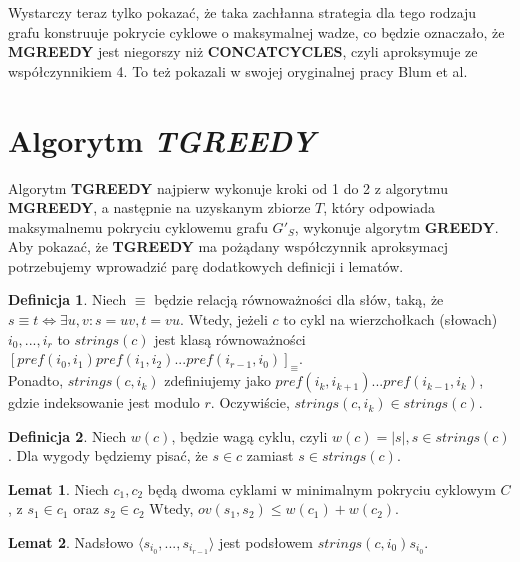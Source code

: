 \documentclass[12pt]{article}
\theoremstyle{definition}
\newtheorem{lemma}{Lemat}
\newtheorem{definition}{Definicja}
\begin{document}
Wystarczy teraz tylko pokazać, że taka zachłanna strategia dla tego rodzaju grafu konstruuje pokrycie cyklowe o maksymalnej wadze, co będzie oznaczało, że \textbf{MGREEDY} jest niegorszy niż \textbf{CONCATCYCLES}, czyli aproksymuje ze współczynnikiem 4. To też pokazali w swojej oryginalnej pracy Blum et al.

\section*{Algorytm \textit{TGREEDY}}

Algorytm \textbf{TGREEDY} najpierw wykonuje kroki od 1 do 2 z algorytmu \textbf{MGREEDY}, a następnie na uzyskanym zbiorze $T$, który odpowiada
maksymalnemu pokryciu cyklowemu grafu $G'_S$, wykonuje algorytm \textbf{GREEDY}. Aby pokazać, że \textbf{TGREEDY} ma pożądany współczynnik aproksymacj potrzebujemy wprowadzić parę dodatkowych definicji i lematów.

\begin{definition} Niech $\equiv$ będzie relacją równoważności dla słów, taką, że $s \equiv t \Leftrightarrow \exists u,v: s = uv, t = vu$. 
Wtedy, jeżeli $c$ to cykl na wierzchołkach (słowach) $i_0, ..., i_r$ to 
$strings(c)$ jest klasą równoważności $[pref(i_0, i_1)pref(i_1,i_2)...pref(i_{r-1},i_0)]_\equiv$.\\
Ponadto, $strings(c, i_k)$ zdefiniujemy jako
$pref(i_k, i_{k+1})...pref(i_{k-1},i_{k})$, gdzie indeksowanie jest modulo $r$. Oczywiście, $strings(c, i_k) \in strings(c)$.
\end{definition}
\begin{definition}
Niech $w(c)$, będzie wagą cyklu, czyli $w(c) = |s|, s\in strings(c)$. Dla wygody będziemy pisać, że $s\in c$ zamiast $s\in strings(c)$.
\end{definition}

\begin{lemma}\label{lemma9}
  Niech $c_1,c_2$ będą dwoma cyklami w minimalnym pokryciu cyklowym $C$, z $s_1\in c_1$ oraz $s_2 \in c_2$ Wtedy, $ov(s_1,s_2) \leq w(c_1) + w(c_2)$. 
\end{lemma}
\begin{lemma}\label{claim4}
Nadsłowo $\langle s_{i_0},...,s_{i_{r-1}} \rangle $ jest podsłowem $strings(c, i_0)s_{i_0}$.
\end{lemma}
\end{document}
